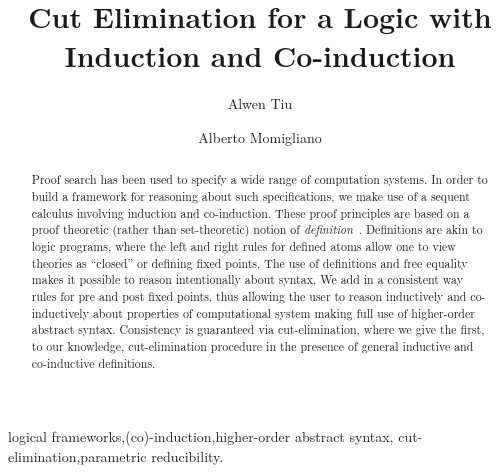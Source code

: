 \documentclass[preprint]{elsarticle}
\begin{document}
\begin{frontmatter}


\title{Cut Elimination for a Logic with Induction and Co-induction}

\author{Alwen Tiu}

\address{Logic and Computation Group\\
College of Engineering and Computer Science\\
The Australian National University}

\author{Alberto Momigliano}
\address{Laboratory for Foundations of Computer Science\\
School of Informatics\\ The University of Edinburgh}







\begin{abstract}
  Proof search has been used to specify a wide range of computation
  systems.  In order to build a framework for reasoning about such
  specifications, we make use of a sequent calculus involving
  induction and co-induction.  These proof principles are based on a
  proof theoretic (rather than set-theoretic) notion of
  \emph{definition}~\cite{PID,eriksson91elp,schroeder-heister93lics,mcdowell00tcs}.
  Definitions are akin to logic programs, where the left and right
  rules for defined atoms allow one to view theories as ``closed'' or
  defining fixed points.  The use of definitions and free equality
  makes it possible to reason intentionally about syntax.  We add in a
  consistent way rules for pre and post fixed points, thus allowing
  the user to reason inductively and co-inductively about properties
  of computational system making full use of higher-order abstract
  syntax.  Consistency is guaranteed via cut-elimination, where we
  give the first, to our knowledge, cut-elimination procedure in the
  presence of general inductive and co-inductive definitions.
\end{abstract}


\begin{keyword}
logical frameworks\sep  (co)-induction\sep higher-order abstract syntax\sep
cut-elimination\sep parametric reducibility.
\end{keyword}
\end{frontmatter}
\end{document}
